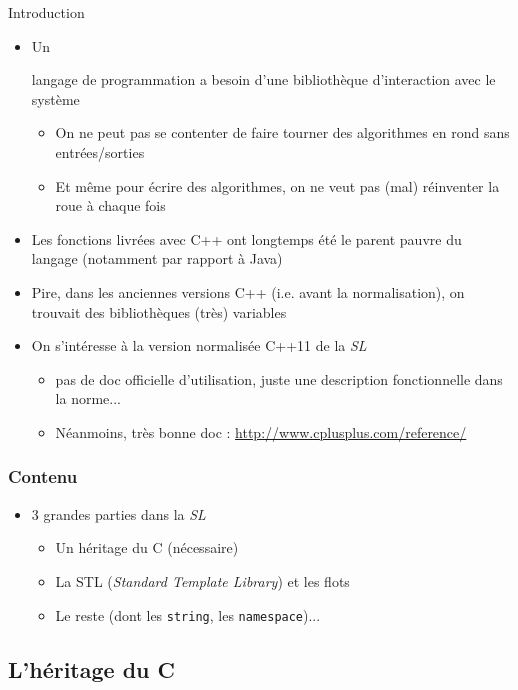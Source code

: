 
\begin{frame}{Introduction}
\label{secstl}
\begin{itemize}
\item \hypertarget{pdf:stl}{Un} langage de programmation a besoin d'une bibliothèque d'interaction avec le système
\begin{itemize}
\item On ne peut pas se contenter de faire tourner des algorithmes en rond sans entrées/sorties
\item Et même pour écrire des algorithmes, on ne veut pas (mal) réinventer la roue à chaque fois
\end{itemize}
\item Les fonctions livrées avec C++ ont longtemps été le parent pauvre du langage (notamment par rapport à Java)
\item Pire, dans les anciennes versions C++ (i.e. avant la normalisation), on trouvait des bibliothèques (très) variables
\item On s'intéresse à la version normalisée C++11 de la \textit{SL}
\begin{itemize}
\item pas de doc officielle d'utilisation, juste une description fonctionnelle dans la norme...
\item Néanmoins, très bonne doc : \url{http://www.cplusplus.com/reference/}
\end{itemize}
\end{itemize}
\end{frame}

\begin{frame}[fragile]\frametitle{Contenu}
\begin{itemize}
\item 3 grandes parties dans la \textit{SL}
\begin{itemize}
\item Un héritage du C (nécessaire)
\item La STL (\textit{Standard Template Library}) et les flots
\item Le reste (dont les \verb|string|, les \verb|namespace|)...
\end{itemize}
\end{itemize}
\end{frame}

\subsection{L'héritage du C}

